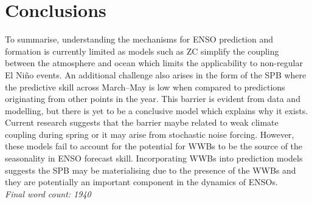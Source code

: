 \documentclass[12pt, onecolumn]{revtex4}    %
\begin{document}
\section{Conclusions}
\noindent
To summarise, understanding the mechanisms for ENSO prediction and formation is currently limited as models such as ZC simplify the coupling between the atmosphere and ocean which limits the applicability to non-regular El Ni\~{n}o events. An additional challenge also arises in the form of the SPB where the predictive skill across March--May is low when compared to predictions originating from other points in the year. This barrier is evident from data and modelling, but there is yet to be a conclusive model which explains why it exists. Current research suggests that the barrier maybe related to weak climate coupling during spring or it may arise from stochastic noise forcing. However, these models fail to account for the potential for WWBs to be the source of the seasonality in ENSO forecast skill. Incorporating WWBs into prediction models suggests the SPB may be materialising due to the presence of the WWBs and they are potentially an important component in the dynamics of ENSOs. \\

\textit{Final word count: 1940}


\clearpage



\end{document}
